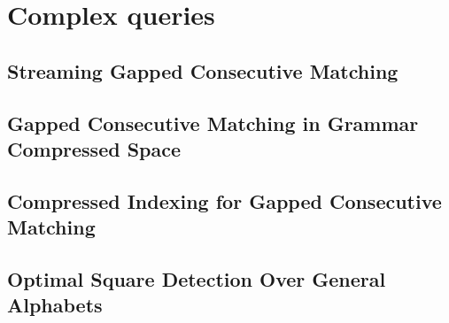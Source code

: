 \part{Complex queries}
\mainmatter



\chapter{Streaming Gapped Consecutive Matching}
\chapter{Gapped Consecutive Matching in Grammar Compressed Space}
\chapter{Compressed Indexing for Gapped Consecutive Matching}

\chapter{Optimal Square Detection Over General Alphabets}